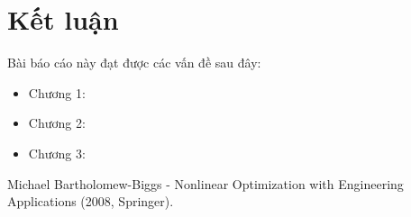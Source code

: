 \documentclass[12pt,a4paper]{report}
\numberwithin{equation}{section}
\theoremstyle{definition} %
\begin{document}
	\chapter*{Kết luận}                         %
	\indent
	\thispagestyle{fancy}
	

Bài báo cáo này đạt được các vấn đề sau đây:
	
	\begin{itemize}
	\item Chương 1:
	

	
	\item Chương 2:

	
	\item Chương 3: 
	

	
	\end{itemize}
	
	\begin{thebibliography}{99}
		\thispagestyle{fancy}
		
		
		
		

		
		 Michael Bartholomew-Biggs - Nonlinear Optimization with Engineering Applications (2008, Springer).
		
		
		
		
		
		
		
		
	\end{thebibliography}
	
	\newpage %
	
	\thispagestyle{empty} %

	\mbox{}
\end{document}
